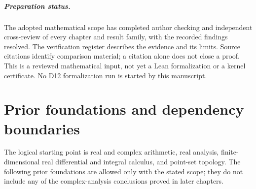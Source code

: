 \documentclass[11pt,a4paper,openany]{book}
\theoremstyle{definition}
\theoremstyle{remark}\newtheorem{remark}[theorem]{Remark}
\begin{document}
\paragraph{Preparation status.}
The adopted mathematical scope has completed author checking and independent
cross-review of every chapter and result family, with the recorded findings
resolved. The verification register describes the evidence and its limits.
Source citations identify comparison material; a citation alone does not close
a proof. This is a reviewed mathematical input, not yet a Lean formalization
or a kernel certificate. No D12 formalization run is started by this manuscript.

\tableofcontents
\mainmatter
\chapter*{Prior foundations and dependency boundaries}
The logical starting point is real and complex arithmetic, real analysis,
finite-dimensional real differential and integral calculus, and point-set
topology. The following prior foundations are allowed only with the stated
scope; they do not include any of the complex-analysis conclusions proved in
later chapters.
\end{document}
